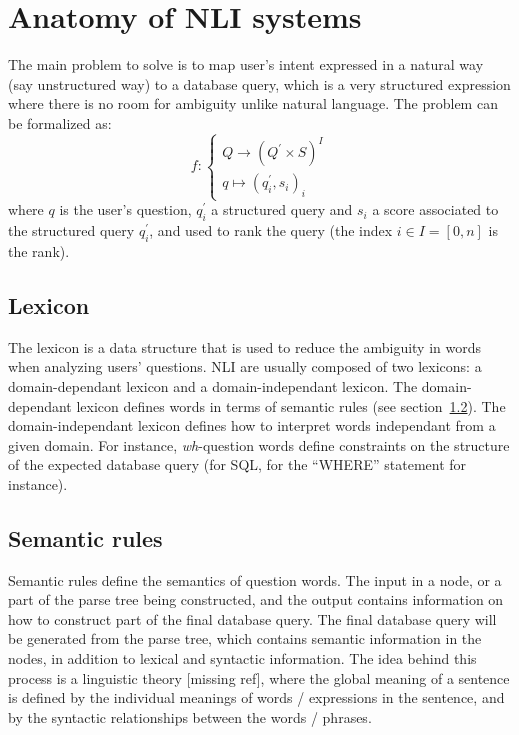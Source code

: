 \documentclass[10pt,journal,letterpaper,compsoc]{IEEEtran}
\begin{document}
\section{Anatomy of NLI systems}
\label{sec:anatomy}
The main problem to solve is to map user's intent expressed in a natural way
(say unstructured way) to a database query, which is a very structured
expression where there is no room for ambiguity unlike natural language.
The problem can be formalized as:
\begin{equation}
f:\left\{
\begin{array}{l}
Q\rightarrow (Q^\prime\times S)^I\\
q\mapsto(q^\prime_i, s_i)_i
\end{array}\right.
\end{equation}
where $q$ is the user's question, $q^\prime_i$ a structured query and $s_i$ a
score associated to the structured query $q^\prime_i$, and used to rank the
query (the index $i\in I=[0,n]$ is the rank).
 


\subsection{Lexicon}
The lexicon is a data structure that is used to reduce the ambiguity in words
when analyzing users' questions. 
NLI are usually composed of two lexicons: a domain-dependant lexicon and a
domain-independant lexicon. 
The domain-dependant lexicon defines words in terms of semantic rules (see
section~\ref{sec:anatomy-semantic-rules}).
The domain-independant lexicon defines how to interpret words independant from a
given domain. For instance, {\it wh}-question words define constraints on the
structure of the expected database query (for SQL, for the ``WHERE'' statement
for instance). 



\subsection{Semantic rules}
\label{sec:anatomy-semantic-rules}
Semantic rules define the semantics of question words. The input in a node, or a
part of the parse tree being constructed, and the output contains information on
how to construct part of the final database query. The final database query will
be generated from the parse tree, which contains semantic information in the
nodes, in addition to lexical and syntactic information. 
The idea behind this process is a linguistic theory [missing ref], where the
global meaning of a sentence is defined by the individual meanings of words /
expressions in the sentence, and by the syntactic relationships between the
words / phrases. 
\end{document}
